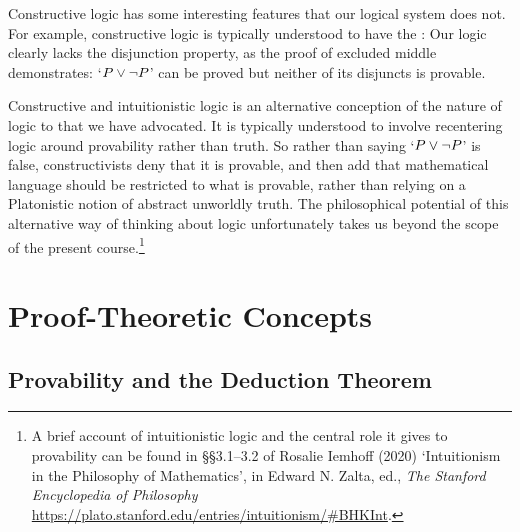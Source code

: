 Constructive logic has some interesting features that our logical system does not. For example, constructive logic is typically understood to have the :  Our logic clearly lacks the disjunction property, as the proof of excluded middle demonstrates: `$P\vee\neg P$' can be proved but neither of its disjuncts is provable. 

Constructive and intuitionistic logic is an alternative conception of the nature of logic to that we have advocated. It is typically understood to involve recentering logic around provability rather than truth. So rather than saying `$P\vee\neg P$' is false, constructivists deny that it is provable, and then add that mathematical language should be restricted to what is provable, rather than relying on a Platonistic notion of abstract unworldly truth. The philosophical potential of this alternative way of thinking about logic unfortunately takes us beyond the scope of the present course.\footnote{A brief account of intuitionistic logic and the central role it gives to provability can be found in §§3.1–3.2 of  Rosalie Iemhoff (2020) `Intuitionism in the Philosophy of Mathematics', in Edward N. Zalta, ed., \emph{The Stanford Encyclopedia of Philosophy} \url{https://plato.stanford.edu/entries/intuitionism/\#BHKInt}.}




\chapter{Proof-Theoretic Concepts}\label{s:ProofTheoreticConcepts}

\section{Provability and the Deduction Theorem}

